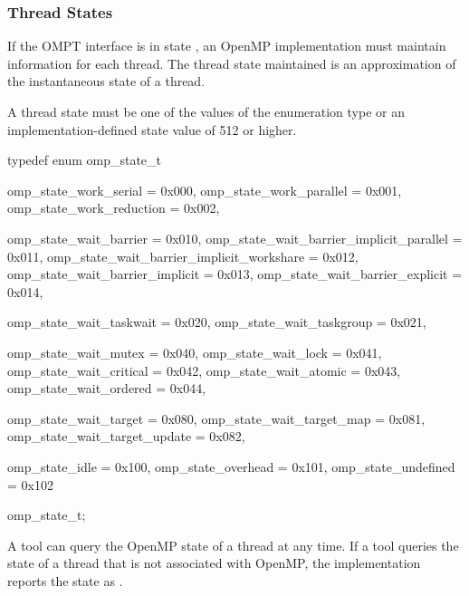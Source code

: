 \subsubsection{Thread States}
\label{sec:thread-states}
\label{sec:omp_state_t}
\summary
If the OMPT interface is in state , an OpenMP implementation
must maintain  information for each thread.
The thread state maintained is an approximation of the instantaneous
state of a thread.

\format
\begin{ccppspecific}
A thread state must be one of the values of the
enumeration type  or
an implementation-defined state value of 512 or higher.

\begin{ompcEnum}
typedef enum omp_state_t {
  omp_state_work_serial                      = 0x000,
  omp_state_work_parallel                    = 0x001,
  omp_state_work_reduction                   = 0x002,

  omp_state_wait_barrier                     = 0x010,
  omp_state_wait_barrier_implicit_parallel   = 0x011,
  omp_state_wait_barrier_implicit_workshare  = 0x012,
  omp_state_wait_barrier_implicit            = 0x013,
  omp_state_wait_barrier_explicit            = 0x014,

  omp_state_wait_taskwait                    = 0x020,
  omp_state_wait_taskgroup                   = 0x021,

  omp_state_wait_mutex                       = 0x040,
  omp_state_wait_lock                        = 0x041,
  omp_state_wait_critical                    = 0x042,
  omp_state_wait_atomic                      = 0x043,
  omp_state_wait_ordered                     = 0x044,

  omp_state_wait_target                      = 0x080,
  omp_state_wait_target_map                  = 0x081,
  omp_state_wait_target_update               = 0x082,

  omp_state_idle                             = 0x100,
  omp_state_overhead                         = 0x101,
  omp_state_undefined                        = 0x102
} omp_state_t;
\end{ompcEnum}
\end{ccppspecific}

\descr

A tool can query the OpenMP state of a thread at any time.
If a tool queries the state of a thread that is not associated
with OpenMP, the implementation reports the state as .


